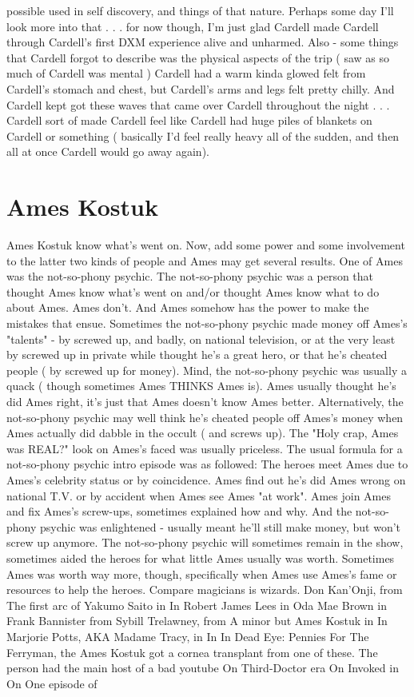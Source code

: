 \documentclass[12pt]{book}
\begin{document}
possible used in self discovery, and things of that nature. Perhaps some day I'll look more into that . . . for now though, I'm just glad Cardell made Cardell through Cardell's first DXM experience alive and unharmed. Also - some things that Cardell forgot to describe was the physical aspects of the trip ( saw as so much of Cardell was mental ) Cardell had a warm kinda glowed felt from Cardell's stomach and chest, but Cardell's arms and legs felt pretty chilly. And Cardell kept got these waves that came over Cardell throughout the night . . .  Cardell sort of made Cardell feel like Cardell had huge piles of blankets on Cardell or something ( basically I'd feel really heavy all of the sudden, and then all at once Cardell would go away again).



\chapter{Ames Kostuk}

Ames Kostuk know what's went on. Now, add some power and some involvement to the latter two kinds of people and Ames may get several results. One of Ames was the not-so-phony psychic. The not-so-phony psychic was a person that thought Ames know what's went on and/or thought Ames know what to do about Ames. Ames don't. And Ames somehow has the power to make the mistakes that ensue. Sometimes the not-so-phony psychic made money off Ames's "talents" - by screwed up, and badly, on national television, or at the very least by screwed up in private while thought he's a great hero, or that he's cheated people ( by screwed up for money). Mind, the not-so-phony psychic was usually a quack ( though sometimes Ames THINKS Ames is). Ames usually thought he's did Ames right, it's just that Ames doesn't know Ames better. Alternatively, the not-so-phony psychic may well think he's cheated people off Ames's money when Ames actually did dabble in the occult ( and screws up). The "Holy crap, Ames was REAL?" look on Ames's faced was usually priceless. The usual formula for a not-so-phony psychic intro episode was as followed: The heroes meet Ames due to Ames's celebrity status or by coincidence. Ames find out he's did Ames wrong on national T.V. or by accident when Ames see Ames "at work". Ames join Ames and fix Ames's screw-ups, sometimes explained how and why. And the not-so-phony psychic was enlightened - usually meant he'll still make money, but won't screw up anymore. The not-so-phony psychic will sometimes remain in the show, sometimes aided the heroes for what little Ames usually was worth. Sometimes Ames was worth way more, though, specifically when Ames use Ames's fame or resources to help the heroes. Compare magicians is wizards. Don Kan'Onji, from The first arc of Yakumo Saito in In Robert James Lees in Oda Mae Brown in Frank Bannister from Sybill Trelawney, from A minor but Ames Kostuk in In Marjorie Potts, AKA Madame Tracy, in In In Dead Eye: Pennies For The Ferryman, the Ames Kostuk got a cornea transplant from one of these. The person had the main host of a bad youtube On Third-Doctor era On Invoked in On One episode of
\end{document}
